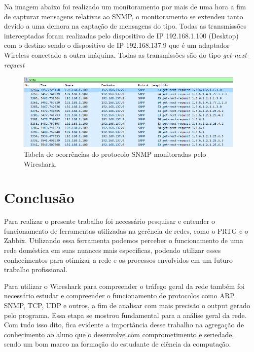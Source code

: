 \documentclass[12pt]{article}
\begin{document}
Na imagem abaixo foi realizado um monitoramento por mais de uma hora a fim de capturar mensagens relativas ao SNMP, o monitoramento se extendeu tanto devido a uma demora na captação de mensagens do tipo. Todas as transmissões interceptadas foram realizadas pelo dispositivo de IP 192.168.1.100 (Desktop) com o destino sendo o dispositivo de IP 192.168.137.9 que é um adaptador Wireless conectado a outra máquina. Todas as transmissões são do tipo \emph{get-next-request} 

\begin{figure}[H]
    \includegraphics[width=\linewidth]{wireshark_snmp.png}
    \caption{Tabela de ocorrências do protocolo SNMP monitoradas pelo Wireshark.}
\end{figure}

\section{Conclusão}

Para realizar o presente trabalho foi necessário pesquisar e entender o funcionamento de ferramentas utilizadas na gerência de redes, como o PRTG e o Zabbix. Utilizando essa ferramenta podemos perceber o funcionamento de uma rede doméstica em suas nuances mais específicas, podendo utilizar esses conhecimentos para otimizar a rede e os processos envolvidos em um futuro trabalho profissional.

Para utilizar o Wireshark para compreender o tráfego geral da rede também foi necessário estudar e compreender o funcionamento de protocolos como ARP, SNMP, TCP, UDP e outros, a fim de analisar com mais precisão o output gerado pelo programa. Essa etapa se mostrou fundamental para a análise geral da rede. Com tudo isso dito, fica evidente a importância desse trabalho na agregação de conhecimento ao aluno que o desenvolve com comprometimento e seriedade, sendo um bom marco na formação do estudante de ciência da computação.

\nocite{*}
\medskip



\end{document}
